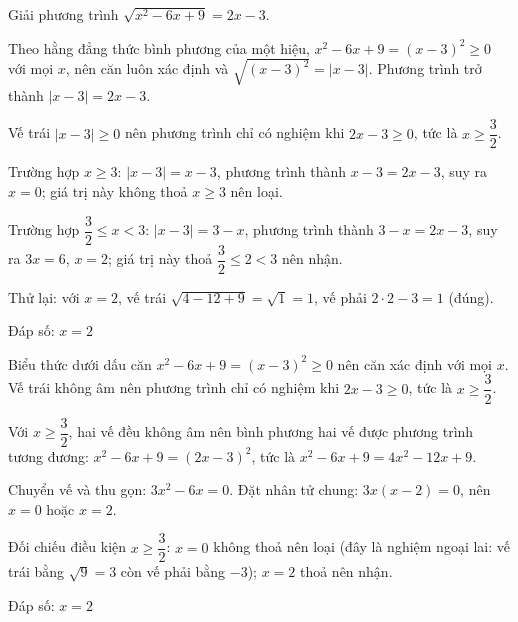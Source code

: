 \begin{problem}[9DS-CAN-009]
Giải phương trình $\sqrt{x^2 - 6x + 9} = 2x - 3$.

\begin{solution}[cách 1: dùng hằng đẳng thức $\sqrt{A^2} = |A|$]
Theo hằng đẳng thức bình phương của một hiệu, $x^2 - 6x + 9 = (x - 3)^2 \geq 0$ với mọi $x$, nên căn luôn xác định và $\sqrt{(x - 3)^2} = |x - 3|$. Phương trình trở thành $|x - 3| = 2x - 3$.

Vế trái $|x - 3| \geq 0$ nên phương trình chỉ có nghiệm khi $2x - 3 \geq 0$, tức là $x \geq \dfrac{3}{2}$.

Trường hợp $x \geq 3$: $|x - 3| = x - 3$, phương trình thành $x - 3 = 2x - 3$, suy ra $x = 0$; giá trị này không thoả $x \geq 3$ nên loại.

Trường hợp $\dfrac{3}{2} \leq x < 3$: $|x - 3| = 3 - x$, phương trình thành $3 - x = 2x - 3$, suy ra $3x = 6$, $x = 2$; giá trị này thoả $\dfrac{3}{2} \leq 2 < 3$ nên nhận.

Thử lại: với $x = 2$, vế trái $\sqrt{4 - 12 + 9} = \sqrt{1} = 1$, vế phải $2 \cdot 2 - 3 = 1$ (đúng).

Đáp số: $\boxed{x = 2}$
\end{solution}

\begin{solution}
Biểu thức dưới dấu căn $x^2 - 6x + 9 = (x - 3)^2 \geq 0$ nên căn xác định với mọi $x$. Vế trái không âm nên phương trình chỉ có nghiệm khi $2x - 3 \geq 0$, tức là $x \geq \dfrac{3}{2}$.

Với $x \geq \dfrac{3}{2}$, hai vế đều không âm nên bình phương hai vế được phương trình tương đương: $x^2 - 6x + 9 = (2x - 3)^2$, tức là $x^2 - 6x + 9 = 4x^2 - 12x + 9$.

Chuyển vế và thu gọn: $3x^2 - 6x = 0$. Đặt nhân tử chung: $3x(x - 2) = 0$, nên $x = 0$ hoặc $x = 2$.

Đối chiếu điều kiện $x \geq \dfrac{3}{2}$: $x = 0$ không thoả nên loại (đây là nghiệm ngoại lai: vế trái bằng $\sqrt{9} = 3$ còn vế phải bằng $-3$); $x = 2$ thoả nên nhận.

Đáp số: $\boxed{x = 2}$
\end{solution}
\end{problem}

